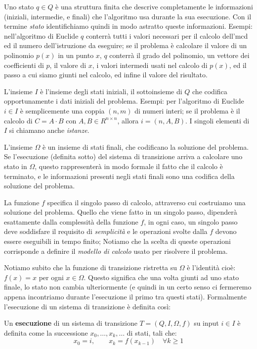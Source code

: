 Uno stato $q \in Q$ è una struttura finita che descrive completamente le informazioni (iniziali, intermedie, e finali) che l'algoritmo usa durante la sua esecuzione. Con il termine \emph{stato} identifichiamo quindi in modo astratto
queste informazioni. Esempi: nell'algoritmo di Euclide $q$ conterrà tutti i valori necessari per il calcolo dell'mcd ed il numero dell'istruzione da eseguire; se il problema è calcolare il valore di un polinomio $p(x)$ in un punto $x$, $q$ conterrà il grado del polinomio, un vettore dei coefficienti di $p$, il valore di $x$, i valori intermedi usati nel calcolo di $p(x)$, ed il passo a cui siamo giunti nel calcolo, ed infine il valore del risultato.

L'insieme $I$ è l'insieme degli stati iniziali, il sottoinsieme di $Q$ che codifica opportunamente i dati iniziali
del problema. Esempi: per l'algoritmo di Euclide $i \in I$ è semplicemente una coppia $(n,m)$ di numeri
interi; se il problema è il calcolo di $C = A \cdot B$ con $A,B \in R^{n \times n}$, allora
$i = (n,A,B)$. I singoli elementi di $I$ si chiamano anche \emph{istanze}.

L'insieme $\Omega$ è un insieme di stati finali, che codificano la soluzione del problema. Se l'esecuzione
(definita sotto) del sistema di transizione arriva a calcolare uno stato in $\Omega$, questo rappresenterà
in modo formale il fatto che il calcolo è terminato, e le informazioni presenti negli stati finali sono
una codifica della soluzione del problema.

La funzione $f$ specifica il singolo passo di calcolo, attraverso cui costruiamo una soluzione del problema. Quello che viene fatto in un singolo passo, dipenderà esattamente dalla complessità della funzione $f$, in ogni caso, un singolo passo deve soddisfare il requisito di \emph{semplicità} e le operazioni svolte dalla $f$ devono essere eseguibili in tempo finito; Notiamo che la scelta di queste operazioni corrisponde a definire il \emph{modello di calcolo} usato per risolvere
il problema.


Notiamo subito che la funzione di transizione ristretta su $\Omega$ è l'identità cioè: $f(x) = x$ per ogni $x \in \Omega$. Questo significa che una volta giunti ad uno stato finale, lo stato non cambia ulteriormente (e quindi in un certo senso ci fermeremo appena incontriamo durante l'esecuzione il primo tra questi stati). Formalmente l'esecuzione di un sistema di transizione è definita così:

\begin{defn} Un \textbf{esecuzione} di un sistema di transizione $T =
  (Q,I,\Omega,f)$ su input $i \in I$ è definita come la successione
  $x_0,\ldots,x_k,\ldots$ di stati, tali che:
 \[ x_0 = i, \qquad x_{k} = f(x_{k-1})\quad \forall k \geq 1 \]
\end{defn}

